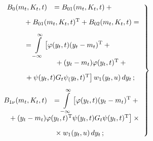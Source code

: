 \begin{multicols}{2}
\noindent
\begin{equation}
\left.
\begin{array}{rl}
B_0 (m_t, K_t, t)&= B_{01} (m_t, K_t, t)+{}\\[9pt]
&\hspace*{-15mm}{}+B_{01} (m_t, K_t, t)^{\mathrm{T}} +B_{02} (m_t, K_t, t)={}\\[9pt]
&\hspace*{-15mm}{}=\displaystyle\iin \left[ \varphi(y_t, t) (y_t - m_t)^{\mathrm{T}} +{}\right.\\
&\left.{}+(y_t - m_t) 
\varphi(y_t, t)^{\mathrm{T}} +{}\right.\\[9pt]
&\hspace*{-15mm}\left.{}+\psi(y_t, t) G_t \psi_(y_t, t)^{\mathrm{T}} \right]  w_1 (y_t,u)\, dy_t\,;\\[9pt]
B_{1\nu} (m_t, K_t, t)&=\displaystyle\iin \left[ 
\varphi(y_t, t) (y_t- m_t)^{\mathrm{T}} +{}\right.\\[9pt] 
&\hspace*{-23mm}\left.{}+(y_t-m_t) \varphi(y_t, t)^{\mathrm{T}} \psi (y_t, t) G_t 
\psi (y_t, t)^{\mathrm{T}} \right]\times{}\\[9pt]
&{}\times w_1 (y_t,u)\, dy_t\,;
\end{array}\!
\right\}\!
\label{e17s}
\end{equation}


\end{multicols}
